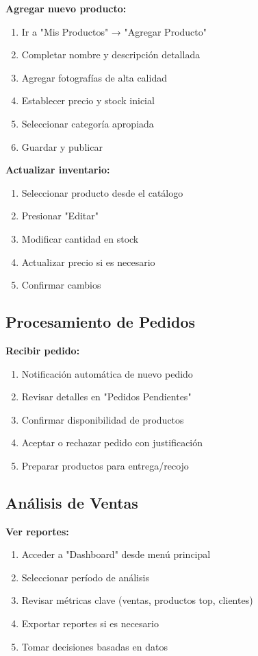 \documentclass[12pt,a4paper]{report}
\begin{document}
\textbf{Agregar nuevo producto:}
\begin{enumerate}
	\item Ir a "Mis Productos" → "Agregar Producto"
	\item Completar nombre y descripción detallada
	\item Agregar fotografías de alta calidad
	\item Establecer precio y stock inicial
	\item Seleccionar categoría apropiada
	\item Guardar y publicar
\end{enumerate}

\textbf{Actualizar inventario:}
\begin{enumerate}
	\item Seleccionar producto desde el catálogo
	\item Presionar "Editar"
	\item Modificar cantidad en stock
	\item Actualizar precio si es necesario
	\item Confirmar cambios
\end{enumerate}

\subsection{Procesamiento de Pedidos}

\textbf{Recibir pedido:}
\begin{enumerate}
	\item Notificación automática de nuevo pedido
	\item Revisar detalles en "Pedidos Pendientes"
	\item Confirmar disponibilidad de productos
	\item Aceptar o rechazar pedido con justificación
	\item Preparar productos para entrega/recojo
\end{enumerate}

\subsection{Análisis de Ventas}

\textbf{Ver reportes:}
\begin{enumerate}
	\item Acceder a "Dashboard" desde menú principal
	\item Seleccionar período de análisis
	\item Revisar métricas clave (ventas, productos top, clientes)
	\item Exportar reportes si es necesario
	\item Tomar decisiones basadas en datos
\end{enumerate}
\end{document}
